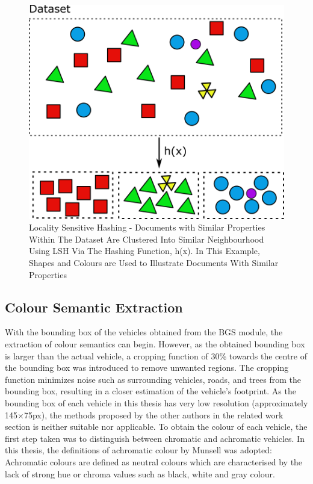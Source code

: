 \begin{figure}[hbt!]\centering
\includegraphics[width=.7\textwidth]{image/new/lsh.png}
\caption{Locality Sensitive Hashing - Documents with Similar Properties Within The Dataset Are Clustered Into Similar Neighbourhood Using LSH Via The Hashing Function, h(x). In This Example, Shapes and Colours are Used to Illustrate Documents With Similar Properties}
\label{fig:lshexample}
\end{figure}

\subsection{Colour Semantic Extraction }
\label{section:versionOneColorExtract}

With the bounding box of the vehicles obtained from the BGS module, the extraction of colour semantics can begin.
However, as the obtained bounding box is larger than the actual vehicle, a cropping function of 30\% towards the centre of the bounding box was introduced to remove unwanted regions.
The cropping function minimizes noise such as surrounding vehicles, roads, and trees from the bounding box, resulting in a closer estimation of the vehicle's footprint.
As the bounding box of each vehicle in this thesis has very low resolution (approximately 145$\times$75px), the methods proposed by the other authors in the related work section is neither suitable nor applicable.
To obtain the colour of each vehicle, the first step taken was to distinguish between chromatic and achromatic vehicles.
In this thesis, the definitions of achromatic colour by Munsell was adopted: Achromatic colours are defined as neutral colours which are characterised by the lack of strong hue or chroma values such as black, white and gray colour.

